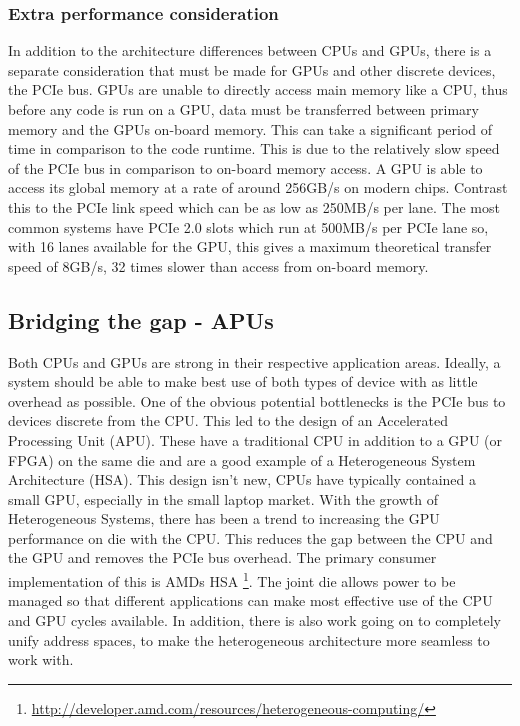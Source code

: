 \subsubsection{Extra performance consideration}

In addition to the architecture differences between CPUs and GPUs, there is a
separate consideration that must be made for GPUs and other discrete devices,
the PCIe bus. GPUs are unable to directly access main memory like a CPU, thus
before any code is run on a GPU, data must be transferred between primary memory
and the GPUs on-board memory. This can take a significant period of time in
comparison to the code runtime. This is due to the relatively slow speed of the
PCIe bus in comparison to on-board memory access. A GPU is able to access its
global memory at a rate of around 256GB/s on modern chips. Contrast this to the
PCIe link speed which can be as low as 250MB/s per lane. The most common systems
have PCIe 2.0 slots which run at 500MB/s per PCIe lane so, with 16 lanes
available for the GPU, this gives a maximum theoretical transfer speed of 8GB/s,
32 times slower than access from on-board memory.

\subsection{Bridging the gap - APUs}

Both CPUs and GPUs are strong in their respective application areas. Ideally, a
system should be able to make best use of both types of device with as little
overhead as possible. One of the obvious potential bottlenecks is the PCIe bus
to devices discrete from the CPU. This led to the design of an Accelerated
Processing Unit (APU). These have a traditional CPU in addition to a GPU (or
FPGA) on the same die and are a good example of a Heterogeneous System
Architecture (HSA). This design isn't new, CPUs have typically contained a small
GPU, especially in the small laptop market. With the growth of Heterogeneous
Systems, there has been a trend to increasing the GPU performance on die with
the CPU. This reduces the gap between the CPU and the GPU and removes the PCIe
bus overhead. The primary consumer implementation of this is AMDs HSA
\footnote{\url{http://developer.amd.com/resources/heterogeneous-computing/}}.
The joint die allows power to be managed so that different applications can make
most effective use of the CPU and GPU cycles available. In addition, there is
also work going on to completely unify address spaces, to make the heterogeneous
architecture more seamless to work with.

